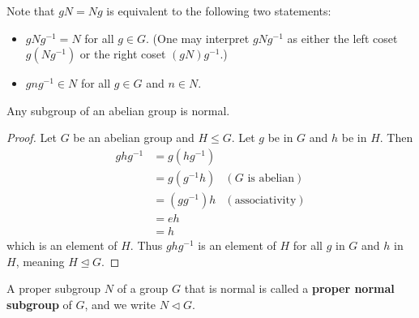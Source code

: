 Note that $gN = Ng$ is equivalent to the following two statements:
\begin{itemize}
    \item $gNg^{-1} = N$ for all $g \in G$. (One may interpret $gNg^{-1}$ as either the left coset $g(Ng^{-1})$ or the right coset $(gN)g^{-1}$.)
    \item $gng^{-1} \in N$ for all $g \in G$ and $n \in N$.
\end{itemize}

\begin{proposition}\label{prop-subgroup-of-abelian-group-is-normal}
    Any subgroup of an abelian group is normal.
\end{proposition}
\begin{proof}
    Let $G$ be an abelian group and $H \leq G$. Let $g$ be in $G$ and $h$ be in $H$. Then
    \begin{align*}
        ghg^{-1} &= g(hg^{-1})\\
        &= g(g^{-1}h) & (G \text{ is abelian})\\
        &= (gg^{-1})h & (\text{associativity})\\
        &= eh\\
        &= h
    \end{align*}
    which is an element of $H$. Thus $ghg^{-1}$ is an element of $H$ for all $g$ in $G$ and $h$ in $H$, meaning $H \unlhd G$.
\end{proof}

\begin{definition}
    A proper subgroup $N$ of a group $G$ that is normal is called a \textbf{proper normal subgroup} of $G$, and we write $N \lhd G$.
\end{definition}

